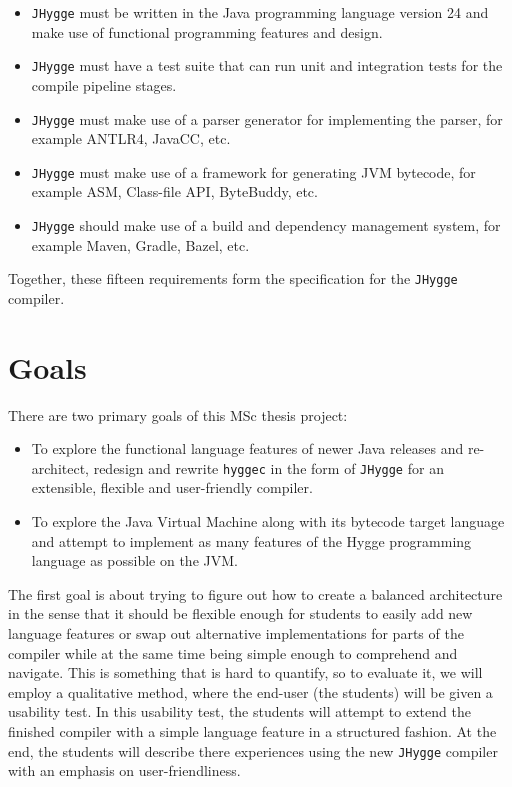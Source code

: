 \begin{itemize}
  \item \texttt{JHygge} must be written in the Java programming language version 24 and make use of functional programming features and design.
  \item \texttt{JHygge} must have a test suite that can run unit and integration tests for the compile pipeline stages.
  \item \texttt{JHygge} must make use of a parser generator for implementing the parser, for example ANTLR4, JavaCC, etc.
  \item \texttt{JHygge} must make use of a framework for generating JVM bytecode, for example ASM, Class-file API, ByteBuddy, etc.
  \item \texttt{JHygge} should make use of a build and dependency management system, for example Maven, Gradle, Bazel, etc.
\end{itemize}

Together, these fifteen requirements form the specification for the \texttt{JHygge} compiler.

\section{Goals}

There are two primary goals of this MSc thesis project:

\begin{itemize}
  \item To explore the functional language features of newer Java releases and re-architect, redesign and rewrite \texttt{hyggec} in the form of \texttt{JHygge} for an extensible, flexible and user-friendly compiler.
  \item To explore the Java Virtual Machine along with its bytecode target language and attempt to implement as many features of the Hygge programming language as possible on the JVM.
\end{itemize}

The first goal is about trying to figure out how to create a balanced architecture in the sense that it should be flexible enough for students to easily add new language features or swap out alternative
implementations for parts of the compiler while at the same time being simple enough to comprehend and navigate. This is something that is hard to quantify, so to evaluate it, we will
employ a qualitative method, where the end-user (the students) will be given a usability test. In this usability test, the students will attempt to extend the finished compiler with
a simple language feature in a structured fashion. At the end, the students will describe there experiences using the new \texttt{JHygge} compiler with an emphasis on user-friendliness.

